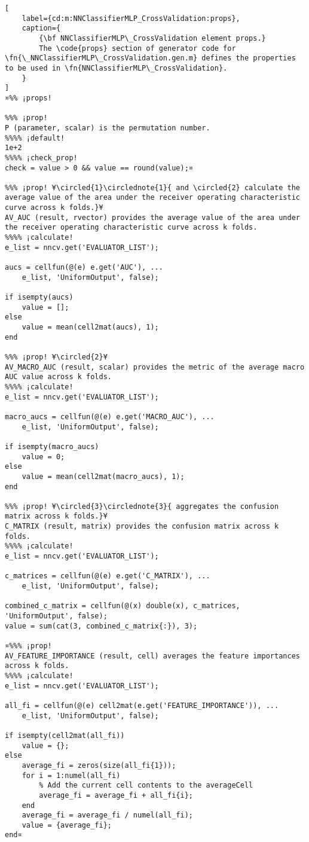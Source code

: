 \documentclass{tufte-handout}
\begin{document}
\begin{lstlisting}[
	label={cd:m:NNClassifierMLP_CrossValidation:props},
	caption={
		{\bf NNClassifierMLP\_CrossValidation element props.}
		The \code{props} section of generator code for \fn{\_NNClassifierMLP\_CrossValidation.gen.m} defines the properties to be used in \fn{NNClassifierMLP\_CrossValidation}.
	}
]
¤%% ¡props!

%%% ¡prop!
P (parameter, scalar) is the permutation number.
%%%% ¡default!
1e+2
%%%% ¡check_prop!
check = value > 0 && value == round(value);¤

%%% ¡prop! ¥\circled{1}\circlednote{1}{ and \circled{2} calculate the average value of the area under the receiver operating characteristic curve across k folds.}¥
AV_AUC (result, rvector) provides the average value of the area under the receiver operating characteristic curve across k folds.
%%%% ¡calculate!
e_list = nncv.get('EVALUATOR_LIST');

aucs = cellfun(@(e) e.get('AUC'), ...
    e_list, 'UniformOutput', false);

if isempty(aucs)
    value = [];
else
    value = mean(cell2mat(aucs), 1);
end

%%% ¡prop! ¥\circled{2}¥
AV_MACRO_AUC (result, scalar) provides the metric of the average macro AUC value across k folds.
%%%% ¡calculate!
e_list = nncv.get('EVALUATOR_LIST');

macro_aucs = cellfun(@(e) e.get('MACRO_AUC'), ...
    e_list, 'UniformOutput', false);

if isempty(macro_aucs)
    value = 0;
else
    value = mean(cell2mat(macro_aucs), 1);
end

%%% ¡prop! ¥\circled{3}\circlednote{3}{ aggregates the confusion matrix across k folds.}¥
C_MATRIX (result, matrix) provides the confusion matrix across k folds.
%%%% ¡calculate!
e_list = nncv.get('EVALUATOR_LIST');

c_matrices = cellfun(@(e) e.get('C_MATRIX'), ...
    e_list, 'UniformOutput', false);

combined_c_matrix = cellfun(@(x) double(x), c_matrices, 'UniformOutput', false);
value = sum(cat(3, combined_c_matrix{:}), 3);

¤%%% ¡prop!
AV_FEATURE_IMPORTANCE (result, cell) averages the feature importances across k folds.
%%%% ¡calculate!
e_list = nncv.get('EVALUATOR_LIST');

all_fi = cellfun(@(e) cell2mat(e.get('FEATURE_IMPORTANCE')), ...
    e_list, 'UniformOutput', false);

if isempty(cell2mat(all_fi))
    value = {};
else
    average_fi = zeros(size(all_fi{1}));
    for i = 1:numel(all_fi)
        % Add the current cell contents to the averageCell
        average_fi = average_fi + all_fi{i};
    end
    average_fi = average_fi / numel(all_fi);
    value = {average_fi};
end¤
\end{lstlisting}
\end{document}
